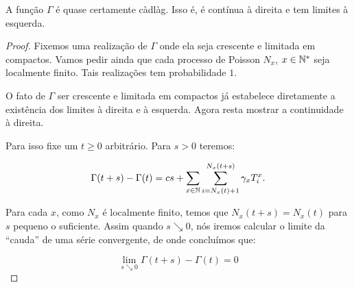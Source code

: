 \begin{proposicao}
  \label{prop:gamma-cadlag}
  A função $\Gamma$ é quase certamente càdlàg. Isso é, é contínua à
  direita e tem limites à esquerda.
\end{proposicao}
\begin{proof}

  Fixemos uma realização de $\Gamma$ onde ela seja crescente e
  limitada em compactos. Vamos pedir ainda que cada processo de
  Poisson $N_x$, $x \in {\mathbb{N^*}}$ seja localmente finito. Tais realizações
  tem probabilidade $1$.

  O fato de $\Gamma$ ser crescente e limitada em compactos já
  estabelece diretamente a existência dos limites à direita e à
  esquerda. Agora resta mostrar a continuidade à direita.

  Para isso fixe um $t \geq 0$ arbitrário. Para $s > 0$ teremos:

  \begin{equation*}
    \Gamma(t+s) - \Gamma(t) = 
    c s + 
    \sum_{x \in {\mathbb{N}}} \sum_{i = N_x(t)+1}^{N_x(t+s)} \gamma_x T^x_i.
  \end{equation*}

  Para cada $x$, como $N_x$ é localmente finito, temos que $N_x(t+s) =
  N_x(t)$ para $s$ pequeno o suficiente. Assim quando $s \searrow 0$,
  nós iremos calcular o limite da ``cauda'' de uma série convergente,
  de onde concluímos que:

  \begin{displaymath}
    \lim_{s \searrow 0} \Gamma(t+s) - \Gamma(t) = 0
  \end{displaymath}
\end{proof}

